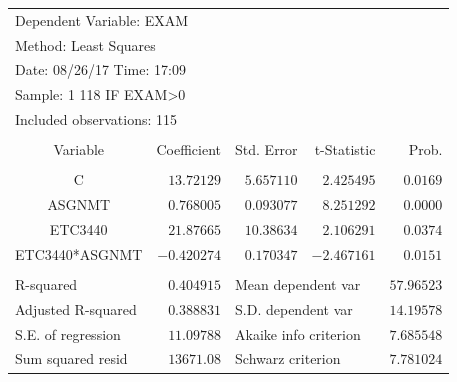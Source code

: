 \documentclass[12pt]{report}
\begin{document}
\begin{table}[H]
	\centering
	\begin{tabular}{lrrrr}
		\multicolumn{3}{l}{Dependent Variable: EXAM}&\multicolumn{1}{c}{}&\multicolumn{1}{c}{}\\
		\multicolumn{3}{l}{Method: Least Squares}&\multicolumn{1}{c}{}&\multicolumn{1}{c}{}\\
		\multicolumn{3}{l}{Date: 08/26/17   Time: 17:09}&\multicolumn{1}{c}{}&\multicolumn{1}{c}{}\\
		\multicolumn{3}{l}{Sample: 1 118 IF EXAM\textgreater 0}&\multicolumn{1}{c}{}&\multicolumn{1}{c}{}\\
		\multicolumn{3}{l}{Included observations: 115}&\multicolumn{1}{c}{}&\multicolumn{1}{c}{}\\
		[4.5pt] \hline \\ [-4.5pt]
		\multicolumn{1}{c}{Variable}&\multicolumn{1}{r}{Coefficient}&\multicolumn{1}{r}{Std. Error}&\multicolumn{1}{r}{t-Statistic}&\multicolumn{1}{r}{Prob.}\\
		[4.5pt] \hline \\ [-4.5pt]
		\multicolumn{1}{c}{C}&\multicolumn{1}{r}{$13.72129$}&\multicolumn{1}{r}{$5.657110$}&\multicolumn{1}{r}{$2.425495$}&\multicolumn{1}{r}{$0.0169$}\\
		\multicolumn{1}{c}{ASGNMT}&\multicolumn{1}{r}{$0.768005$}&\multicolumn{1}{r}{$0.093077$}&\multicolumn{1}{r}{$8.251292$}&\multicolumn{1}{r}{$0.0000$}\\
		\multicolumn{1}{c}{ETC3440}&\multicolumn{1}{r}{$21.87665$}&\multicolumn{1}{r}{$10.38634$}&\multicolumn{1}{r}{$2.106291$}&\multicolumn{1}{r}{$0.0374$}\\
		\multicolumn{1}{c}{ETC3440*ASGNMT}&\multicolumn{1}{r}{$-0.420274$}&\multicolumn{1}{r}{$0.170347$}&\multicolumn{1}{r}{$-2.467161$}&\multicolumn{1}{r}{$0.0151$}\\
		[4.5pt] \hline \\ [-4.5pt]
		\multicolumn{1}{l}{R-squared}&\multicolumn{1}{r}{$0.404915$}&\multicolumn{2}{l}{Mean dependent var}&\multicolumn{1}{r}{$57.96523$}\\
		\multicolumn{1}{l}{Adjusted R-squared}&\multicolumn{1}{r}{$0.388831$}&\multicolumn{2}{l}{S.D. dependent var}&\multicolumn{1}{r}{$14.19578$}\\
		\multicolumn{1}{l}{S.E. of regression}&\multicolumn{1}{r}{$11.09788$}&\multicolumn{2}{l}{Akaike info criterion}&\multicolumn{1}{r}{$7.685548$}\\
		\multicolumn{1}{l}{Sum squared resid}&\multicolumn{1}{r}{$13671.08$}&\multicolumn{2}{l}{Schwarz criterion}&\multicolumn{1}{r}{$7.781024$}\\

\end{tabular}
\end{table}
\end{document}
